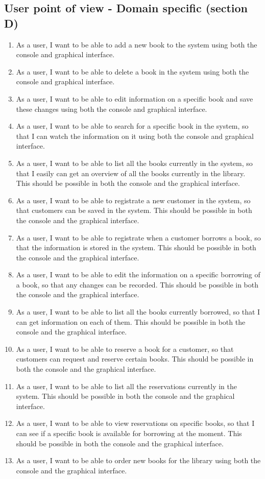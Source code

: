 \subsection{User point of view - Domain specific (section D)}
\begin{enumerate}
  \item As a user, I want to be able to add a new book to the system using both the console and graphical interface.
  \item As a user, I want to be able to delete a book in the system using both the console and graphical interface.
  \item As a user, I want to be able to edit information on a specific book and save these changes using both the console and graphical interface.
  \item As a user, I want to be able to search for a specific book in the system, so that I can watch the information on it using both the console and graphical interface.
  \item As a user, I want to be able to list all the books currently in the system, so that I easily can get an overview of all the books currently in the library. This should be possible in both the console and the graphical interface.
  \item As a user, I want to be able to registrate a new customer in the system, so that customers can be saved in the system. This should be possible in both the console and the graphical interface.
  \item As a user, I want to be able to registrate when a customer borrows a book, so that the information is stored in the system. This should be possible in both the console and the graphical interface.
  \item As a user, I want to be able to edit the information on a specific borrowing of a book, so that any changes can be recorded. This should be possible in both the console and the graphical interface.
  \item As a user, I want to be able to list all the books currently borrowed, so that I can get information on each of them. This should be possible in both the console and the graphical interface.
  \item As a user, I want to be able to reserve a book for a customer, so that customers can request and reserve certain books. This should be possible in both the console and the graphical interface.
  \item As a user, I want to be able to list all the reservations currently in the system. This should be possible in both the console and the graphical interface.
  \item As a user, I want to be able to view reservations on specific books, so that I can see if a specific book is available for borrowing at the moment. This should be possible in both the console and the graphical interface.
  \item As a user, I want to be able to order new books for the library using both the console and the graphical interface.
\end{enumerate}





